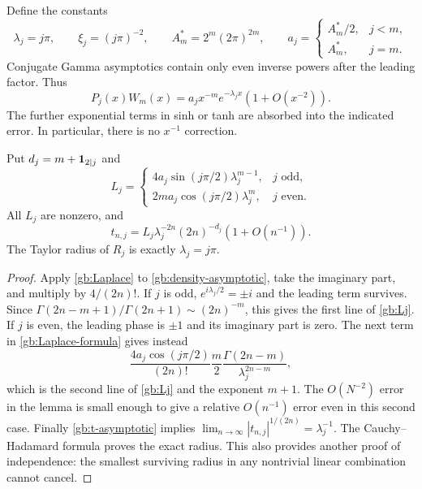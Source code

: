 Define the constants
\begin{equation}\label{gb:mode-constants}
 \lambda_j=j\pi,\qquad \xi_j=(j\pi)^{-2},\qquad
 A_m^*=2^m(2\pi)^{2m},\qquad
 a_j=\begin{cases}A_m^*/2,&j<m,\\A_m^*,&j=m.
 \end{cases}
\end{equation}
Conjugate Gamma asymptotics contain only even inverse powers after
the leading factor.  Thus
\begin{equation}\label{gb:density-asymptotic}
 P_j(x)W_m(x)=a_jx^{-m}e^{-\lambda_jx}(1+O(x^{-2})).
\end{equation}
The further exponential terms in sinh or tanh are absorbed into the
indicated error.  In particular, there is no $x^{-1}$ correction.

\begin{proposition}
\label{gb:coefficient-asymptotic}
Put $d_j=m+\mathbf 1_{2\mid j}$ and
\begin{equation}\label{gb:Lj}
 L_j=\begin{cases}
 4a_j\sin(j\pi/2)\lambda_j^{m-1},&j\text{ odd},\\
 2ma_j\cos(j\pi/2)\lambda_j^m,&j\text{ even}.
 \end{cases}
\end{equation}
All $L_j$ are nonzero, and
\begin{equation}\label{gb:t-asymptotic}
 t_{n,j}=L_j\lambda_j^{-2n}(2n)^{-d_j}(1+O(n^{-1})).
\end{equation}
The Taylor radius of $R_j$ is exactly $\lambda_j=j\pi$.
\end{proposition}

\begin{proof}
Apply \cref{gb:Laplace} to \eqref{gb:density-asymptotic}, take
the imaginary part, and multiply by $4/(2n)!$.  If $j$ is odd,
$e^{i\lambda_j/2}=\pm i$ and the leading term survives.  Since
$\Gamma(2n-m+1)/\Gamma(2n+1)\sim(2n)^{-m}$, this gives the
first line of \eqref{gb:Lj}.  If $j$ is even, the leading phase
is $\pm1$ and its imaginary part is zero.  The next term in
\eqref{gb:Laplace-formula} gives instead
\[
 \frac{4a_j\cos(j\pi/2)}{(2n)!}
 \frac{m}{2}\frac{\Gamma(2n-m)}{\lambda_j^{2n-m}},
\]
which is the second line of \eqref{gb:Lj} and the exponent $m+1$.
The $O(N^{-2})$ error in the lemma is small enough to give a
relative $O(n^{-1})$ error even in this second case.  Finally
\eqref{gb:t-asymptotic} implies
$\lim_{n\to\infty}|t_{n,j}|^{1/(2n)}=\lambda_j^{-1}$.
The Cauchy--Hadamard formula proves the exact radius.  This also
provides another proof of independence: the smallest surviving
radius in any nontrivial linear combination cannot cancel.
\end{proof}

